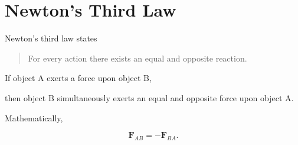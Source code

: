 \section{Newton's Third Law}

Newton's third law states

\begin{quote}
	For every action there exists an equal and opposite reaction.
\end{quote}

If object A exerts a force upon object B,

then object B simultaneously exerts an equal and opposite force upon object A.

Mathematically,

\[
\boxed{
	\mathbf F_{AB}
	=
	-
	\mathbf F_{BA}.
}
\]

